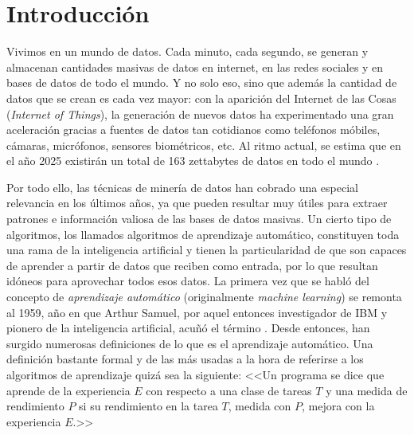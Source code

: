\chapter{Introducción}\label{ch:intro}


Vivimos en un mundo de datos. Cada minuto, cada segundo, se generan y almacenan cantidades masivas de datos en internet, en las redes sociales y en bases de datos de todo el mundo. Y no solo eso, sino que además la cantidad de datos que se crean es cada vez mayor: con la aparición del Internet de las Cosas (\emph{Internet of Things}), la generación de nuevos datos ha experimentado una gran aceleración gracias a fuentes de datos tan cotidianos como teléfonos móbiles, cámaras, micrófonos, sensores biométricos, etc. Al ritmo actual, se estima que en el año 2025 existirán un total de 163 zettabytes de datos en todo el mundo \cite{reinsel2017data}.

Por todo ello, las técnicas de minería de datos han cobrado una especial relevancia en los últimos años, ya que pueden resultar muy útiles para extraer patrones e información valiosa de las bases de datos masivas. Un cierto tipo de algoritmos, los llamados algoritmos de aprendizaje automático, constituyen toda una rama de la inteligencia artificial y tienen la particularidad de que son capaces de aprender a partir de  datos que reciben como entrada, por lo que resultan idóneos para aprovechar todos esos datos. La primera vez que se habló del concepto de \emph{aprendizaje automático} (originalmente \emph{machine learning}) se remonta al 1959, año en que Arthur Samuel, por aquel entonces investigador de IBM y pionero de la inteligencia artificial, acuñó el término \cite{samuel1959some}. Desde entonces, han surgido numerosas definiciones de lo que es el aprendizaje automático. Una definición bastante formal y de las más usadas a la hora de referirse a los algoritmos de aprendizaje quizá sea la siguiente: <<Un programa se dice que aprende de la experiencia $E$ con respecto a una clase de tareas $T$ y una medida de rendimiento $P$ si su rendimiento en la tarea $T$, medida con $P$, mejora con la experiencia $E$.>>\cite{mitchell1997machine}


